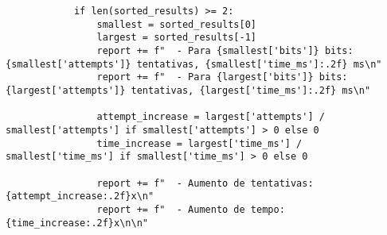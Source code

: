 \begin{verbatim}
            if len(sorted_results) >= 2:
                smallest = sorted_results[0]
                largest = sorted_results[-1]
                report += f"  - Para {smallest['bits']} bits: {smallest['attempts']} tentativas, {smallest['time_ms']:.2f} ms\n"
                report += f"  - Para {largest['bits']} bits: {largest['attempts']} tentativas, {largest['time_ms']:.2f} ms\n"
                
                attempt_increase = largest['attempts'] / smallest['attempts'] if smallest['attempts'] > 0 else 0
                time_increase = largest['time_ms'] / smallest['time_ms'] if smallest['time_ms'] > 0 else 0
                
                report += f"  - Aumento de tentativas: {attempt_increase:.2f}x\n"
                report += f"  - Aumento de tempo: {time_increase:.2f}x\n\n"
\end{verbatim}
